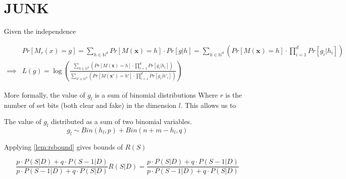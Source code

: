 \documentclass[11pt]{article}
\newcommand{\bbx}{\pmb{x}}
\newcommand{\N}{\mathbb{N}}
\begin{document}
\section{JUNK}


Given the independence 



 \begin{align*}
 & Pr [ M_r(x) = g ] = \sum_{h \in \N^d} Pr \left [  M(\bbx) = h \right ] \cdot Pr [ g | h ] =  \sum_{h \in \N^d} \left ( Pr \left [  M(\bbx) = h \right ] \cdot  \prod_{i=1}^d Pr[ g_i | h_i]  \right ) \\
\implies &  L(g) =  \log  \left ( \frac{  \sum_{h \in \N^d} \left ( Pr \left [  M(\bbx) = h \right ] \cdot  \prod_{i=1}^d Pr[ g_i | h_i]  \right )  }{    \sum_{h' \in \N^d} \left ( Pr \left [  M(\bbx') = h' \right ] \cdot  \prod_{i=1}^d Pr[ g_i | h'_i]  \right )  } \right )
\end{align*}



More formally, the value of $g_l$ is a sum of binomial distributions 
Where $r$ is the number of set bits (both clear and fake) in the dimension $l$.   This allows us to 



The value of $g_l$ distributed as a sum of two binomial variables.  
\[ g_l  \sim Bin(h_l,p) + Bin(n+m-h_l,q) \]
 
 
Applying \eqref{lem:rsbound} gives bounds of $R(S)$

\begin{equation} \label{eq:rsbounds}
 \frac{p \cdot P(S | D ) + q \cdot P( S - 1 | D) } {  p  \cdot P(S -1 | D ) + q \cdot P( S  | D)  } R(S|D)=  \frac{p \cdot P(S | D ) + q \cdot P( S - 1 | D) } {  p  \cdot P(S -1 | D ) + q \cdot P( S  | D)  }
\end{equation}
\end{document}
